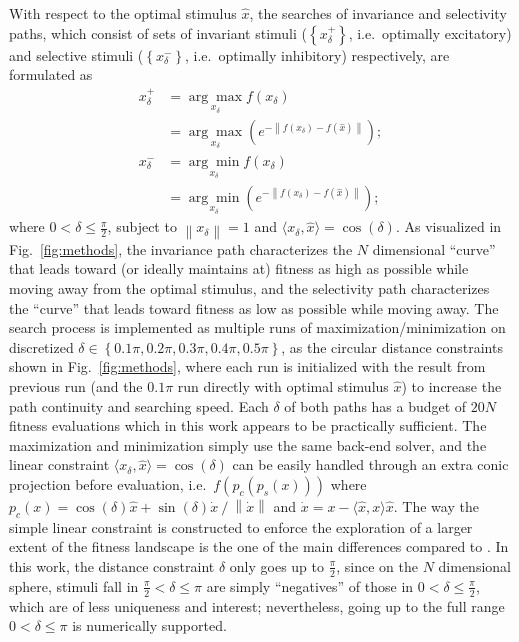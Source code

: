 With respect to the optimal stimulus $\hat{x}$, the searches of invariance and selectivity paths, which consist of sets of invariant stimuli ($\left\lbrace x^{+}_{\delta} \right\rbrace$, i.e.~optimally excitatory) and selective stimuli ($\left\lbrace x^{-}_{\delta} \right\rbrace$, i.e.~optimally inhibitory) respectively, are formulated as
\begin{align}
x^{+}_{\delta} &= \underset{x_{\delta}}{\arg\max} f\left(x_{\delta}\right) \label{eq:I1} \\
&= \underset{x_{\delta}}{\arg\max} \left( e^{-\left\|f\left(x_{\delta}\right)-f\left(\hat{x}\right)\right\|} \right); \label{eq:I2} \\
x^{-}_{\delta} &= \underset{x_{\delta}}{\arg\min} f\left(x_{\delta}\right) \label{eq:S1} \\
&= \underset{x_{\delta}}{\arg\min} \left( e^{-\left\|f\left(x_{\delta}\right)-f\left(\hat{x}\right)\right\|} \right); \label{eq:S2}
\end{align}
where $0 < \delta \le \frac{\pi}{2}$, subject to $\left\| x_{\delta} \right\| = 1$ and $\langle x_{\delta} , \hat{x} \rangle = \cos\left(\delta\right)$. As visualized in Fig.~\ref{fig:methods}, the invariance path characterizes the $N$ dimensional ``curve'' that leads toward (or ideally maintains at) fitness as high as possible while moving away from the optimal stimulus, and the selectivity path characterizes the ``curve'' that leads toward fitness as low as possible while moving away. The search process is implemented as multiple runs of maximization/minimization on discretized $\delta \in \left\lbrace 0.1\pi, 0.2\pi, 0.3\pi, 0.4\pi, 0.5\pi\right\rbrace$, as the circular distance constraints shown in Fig.~\ref{fig:methods}, where each run is initialized with the result from previous run (and the $0.1\pi$ run directly with optimal stimulus $\hat{x}$) to increase the path continuity and searching speed. Each $\delta$ of both paths has a budget of $20N$ fitness evaluations which in this work appears to be practically sufficient. The maximization and minimization simply use the same back-end solver, and the linear constraint $\langle x_{\delta} , \hat{x} \rangle = \cos\left(\delta\right)$ can be easily handled through an extra conic projection before evaluation, i.e.~$f\left(p_c\left(p_s\left(x\right)\right)\right)$ where $p_c\left(x\right) = \cos\left(\delta\right)\hat{x} + \sin\left(\delta\right)\dot{x} \mathbin{/} \left\|\dot{x}\right\|$ and $\dot{x} = x - \langle\hat{x},x\rangle \hat{x}$. The way the simple linear constraint is constructed to enforce the exploration of a larger extent of the fitness landscape is the one of the main differences compared to \cite{erhan2010understanding}.
In this work, the distance constraint $\delta$ only goes up to $\frac{\pi}{2}$, since on the $N$ dimensional sphere, stimuli fall in $\frac{\pi}{2} < \delta \le \pi$ are simply ``negatives'' of those in $0 < \delta \le \frac{\pi}{2}$, which are of less uniqueness and interest; nevertheless, going up to the full range $0 < \delta \le \pi$ is numerically supported.

